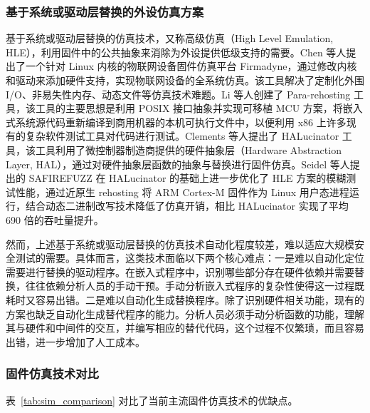 \subsubsection{基于系统或驱动层替换的外设仿真方案}

基于系统或驱动层替换的仿真技术，又称高级仿真（High Level Emulation, HLE），利用固件中的公共抽象来消除为外设提供低级支持的需要。Chen 等人提出了一个针对 Linux 内核的物联网设备固件仿真平台 Firmadyne\cite{firmadyne}，通过修改内核和驱动来添加硬件支持，实现物联网设备的全系统仿真。该工具解决了定制化外围 I/O、非易失性内存、动态文件等仿真技术难题。Li 等人创建了 Para-rehosting\cite{pararehosting} 工具，该工具的主要思想是利用 POSIX 接口抽象并实现可移植 MCU 方案，将嵌入式系统源代码重新编译到商用机器的本机可执行文件中，以便利用 x86 上许多现有的复杂软件测试工具对代码进行测试。Clements 等人提出了 HALucinator\cite{clements2020halucinator} 工具，该工具利用了微控制器制造商提供的硬件抽象层（Hardware Abstraction Layer, HAL），通过对硬件抽象层函数的抽象与替换进行固件仿真。Seidel 等人提出的 SAFIREFUZZ\cite{seidel_forming_2023} 在 HALucinator 的基础上进一步优化了 HLE 方案的模糊测试性能，通过近原生 rehosting 将 ARM Cortex-M 固件作为 Linux 用户态进程运行，结合动态二进制改写技术降低了仿真开销，相比 HALucinator 实现了平均 690 倍的吞吐量提升。

然而，上述基于系统或驱动层替换的仿真技术自动化程度较差，难以适应大规模安全测试的需要。具体而言，这类技术面临以下两个核心难点：一是难以自动化定位需要进行替换的驱动程序。在嵌入式程序中，识别哪些部分存在硬件依赖并需要替换，往往依赖分析人员的手动干预。手动分析嵌入式程序的复杂性使得这一过程既耗时又容易出错。二是难以自动化生成替换程序。除了识别硬件相关功能，现有的方案也缺乏自动化生成替代程序的能力。分析人员必须手动分析函数的功能，理解其与硬件和中间件的交互，并编写相应的替代代码，这个过程不仅繁琐，而且容易出错，进一步增加了人工成本。

\subsubsection{固件仿真技术对比}

表~\ref{tab:sim_comparison} 对比了当前主流固件仿真技术的优缺点。

